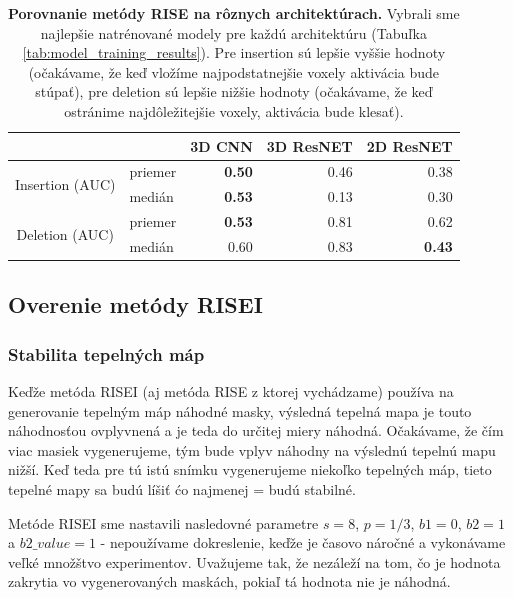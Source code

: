 \begin{table}[]
    \centering
    \begin{tabular}{cl|r|r|r|}
        \cline{3-5}
        \multicolumn{1}{l}{} &  & \multicolumn{1}{c|}{3D CNN} & \multicolumn{1}{c|}{3D ResNET} & \multicolumn{1}{c|}{2D ResNET} \\ \hline
        \multicolumn{1}{|c|}{\multirow{2}{*}{Insertion (AUC)}} & priemer & \textbf{0.50} & 0.46 & 0.38 \\ \cline{2-2}
        \multicolumn{1}{|c|}{}                                 & medián  & \textbf{0.53} & 0.13 & 0.30 \\ \cline{1-2}
        \multicolumn{1}{|c|}{\multirow{2}{*}{Deletion (AUC)}}  & priemer & \textbf{0.53} & 0.81 & 0.62 \\ \cline{2-2}
        \multicolumn{1}{|c|}{}                                 & medián  & 0.60 & 0.83 & \textbf{0.43} \\ \hline
    \end{tabular}
    \caption{\textbf{Porovnanie metódy RISE na rôznych architektúrach.} Vybrali sme najlepšie natrénované modely pre každú architektúru (Tabuľka \ref{tab:model_training_results}). Pre insertion sú lepšie vyššie hodnoty (očakávame, že keď vložíme najpodstatnejšie voxely aktivácia bude stúpať), pre deletion sú lepšie nižšie hodnoty (očakávame, že keď ostránime najdôležitejšie voxely, aktivácia bude klesať).}
    \label{tab:experiment_rise_various_architectures}
\end{table}

\subsection{Overenie metódy RISEI}

\subsubsection{Stabilita tepelných máp \label{sec:risei_stability}}

Keďže metóda RISEI (aj metóda RISE z ktorej vychádzame) používa na generovanie tepelným máp náhodné masky, výsledná tepelná mapa je touto náhodnosťou ovplyvnená a je teda do určitej miery náhodná. Očakávame, že čím viac masiek vygenerujeme, tým bude vplyv náhodny na výslednú tepelnú mapu nižší. Keď teda pre tú istú snímku vygenerujeme niekoľko tepelných máp, tieto tepelné mapy sa budú líšiť ćo najmenej = budú stabilné.

Metóde RISEI sme nastavili nasledovné parametre $s = 8$, $p = 1/3$, $b1 = 0$, $b2 = 1$ a $b2\_value = 1$ - nepoužívame dokreslenie, keďže je časovo náročné a vykonávame veľké množštvo experimentov. Uvažujeme tak, že nezáleží na tom, čo je hodnota zakrytia vo vygenerovaných maskách, pokiaľ tá hodnota nie je náhodná.

